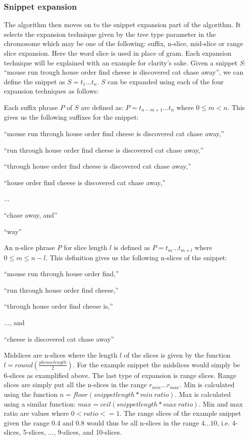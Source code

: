 \subsubsection{Snippet expansion}
The algorithm then moves on to the snippet expansion part of the \CTC algorithm. It selects the expansion technique given by the tree type parameter in the chromosome which may be one of the following: suffix, n-slice, mid-slice or range slice expansion. Here the word slice is used in place of gram. Each expansion technique will be explained with an example for clarity's sake. Given a snippet \(S\): ``mouse run trough house order find cheese is discovered cat chase away'', we can define the snippet as \(S = t_{1} \dots t_{n}\). \(S\) can be expanded using each of the four expansion techniques as follows:

Each suffix phrase \(P\)  of \(S\) are defined as: \(P = t_{n-m+1} \dots t_{n}\) where \(0 \le m < n\). This gives us the following suffixes for the snippet:
\begin{inparaenum}[\itshape 1\upshape)]
\item ``mouse run through house order find cheese is discovered cat chase away,''
\item ``run through house order find cheese is discovered cat chase away,''
\item ``through house order find cheese is discovered cat chase away,''
\item ``house order find cheese is discovered cat chase away,''
\item ...
\item ``chase away, and''
\item ``way''
\end{inparaenum}


An n-slice phrase \(P\) for slice length \(l\) is defined as \(P = t_{m} \dots t_{m+l}\) where \(0 \le m \le n - l\). This definition gives us the following n-slices of the snippet:
\begin{inparaenum}[\itshape 1\upshape)]
\item ``mouse run through house order find,''
\item ``run through house order find cheese,''
\item ``through house order find cheese is,''
\item ..., and
\item ``cheese is discovered cat chase away''
\end{inparaenum}

Midslices are n-slices where the length \(l\) of the slices is given by the function \(l = round(\frac{phraselength}{2})\). For the example snippet the midslices would simply be 6-slices as examplified above. The last type of expansion is range slices. Range slices are simply put all the n-slices in the range \(r_{min} \dots r_{max}\). Min is calculated using the function \(n = floor(snippet length * min~ratio)\). Max is calculated using a similar function: \(max = ceil(snippet length * max~ratio)\).  Min and max ratio are values where \(0 < ratio <= 1\). The range slices of the example snippet given the range 0.4 and 0.8 would thus be all n-slices in the range \(4 \dots 10\), i.e. 4-slices, 5-slices, ..., 9-slices, and 10-slices.

